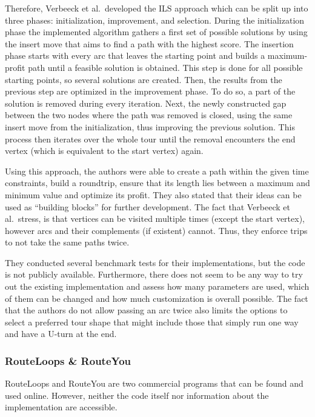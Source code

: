 Therefore, Verbeeck et al.\ developed the ILS approach which can be split up into three phases:
initialization, improvement, and selection.
During the initialization phase the implemented algorithm gathers a first set of possible solutions by using the insert move that aims to find a path with the highest score.
The insertion phase starts with every arc that leaves the starting point and builds a maximum-profit path until a feasible solution is obtained.
This step is done for all possible starting points, so several solutions are created.
Then, the results from the previous step are optimized in the improvement phase. 
To do so, a part of the solution is removed during every iteration.
Next, the newly constructed gap between the two nodes where the path was removed is closed, using the same insert move from the initialization, thus improving the previous solution.
This process then iterates over the whole tour until the removal encounters the end vertex (which is equivalent to the start vertex) again.

Using this approach, the authors were able to create a path within the given time constraints, build a roundtrip, ensure that its length lies between a maximum and minimum value and optimize its profit.
They also stated that their ideas can be used as \enquote{building blocks}  \cite{verbeeck_extension_2014} for further development.
The fact that Verbeeck et al.\ stress, is that vertices can be visited multiple times (except the start vertex), however arcs and their complements (if existent) cannot. 
Thus, they enforce trips to not take the same paths twice.

They conducted several benchmark tests for their implementations, but the code is not publicly available.
Furthermore, there does not seem to be any way to try out the existing implementation and assess how many parameters are used, which of them can be changed and how much customization is overall possible.
The fact that the authors do not allow passing an arc twice also limits the options to select a preferred tour shape that might include those that simply run one way and have a U-turn at the end. 


\subsubsection{RouteLoops \& RouteYou}
\label{subsubsec:routeLoopsrouteYou}

RouteLoops and RouteYou are two commercial programs that can be found and used online. 
However, neither the code itself nor information about the implementation are accessible.

